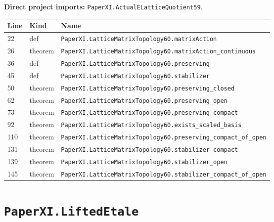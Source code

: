 \documentclass[10pt,oneside]{book}
\begin{document}

\textbf{Direct project imports:} \nolinkurl{PaperXI.ActualELatticeQuotient59}.

\begin{longtable}{@{}p{}p{}p{}@{}}\toprule Line&Kind&Name\\\midrule\endhead

22&def&\nolinkurl{PaperXI.LatticeMatrixTopology60.matrixAction}\\

26&theorem&\nolinkurl{PaperXI.LatticeMatrixTopology60.matrixAction_continuous}\\

36&def&\nolinkurl{PaperXI.LatticeMatrixTopology60.preserving}\\

45&def&\nolinkurl{PaperXI.LatticeMatrixTopology60.stabilizer}\\

50&theorem&\nolinkurl{PaperXI.LatticeMatrixTopology60.preserving_closed}\\

62&theorem&\nolinkurl{PaperXI.LatticeMatrixTopology60.preserving_open}\\

73&theorem&\nolinkurl{PaperXI.LatticeMatrixTopology60.preserving_compact}\\

92&theorem&\nolinkurl{PaperXI.LatticeMatrixTopology60.exists_scaled_basis}\\

110&theorem&\nolinkurl{PaperXI.LatticeMatrixTopology60.preserving_compact_of_open}\\

131&theorem&\nolinkurl{PaperXI.LatticeMatrixTopology60.stabilizer_compact}\\

139&theorem&\nolinkurl{PaperXI.LatticeMatrixTopology60.stabilizer_open}\\

145&theorem&\nolinkurl{PaperXI.LatticeMatrixTopology60.stabilizer_compact_of_open}\\

\bottomrule\end{longtable}

\section{\texorpdfstring{\nolinkurl{PaperXI.LiftedEtale}}{PaperXI.LiftedEtale}}\label{module:PaperXI.LiftedEtale}
\end{document}

